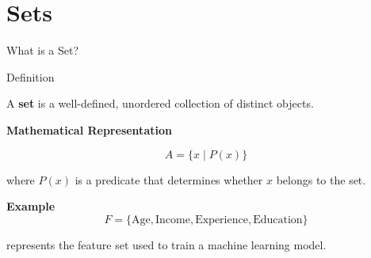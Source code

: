 \section{Sets}

\begin{frame}{What is a Set?}

\begin{block}{Definition}

\vspace{0.1cm}

A \textbf{set} is a well-defined, unordered collection of distinct objects.
\end{block}

\vspace{0.3cm}

\textbf{Mathematical Representation}

\[
A=\{x\mid P(x)\}
\]

where \(P(x)\) is a predicate that determines whether
\(x\) belongs to the set.

\vspace{0.3cm}

\textbf{Example}
\[
F=\{\text{Age},\text{Income},\text{Experience},\text{Education}\}
\]

represents the feature set used to train a machine learning model.

\end{frame}


